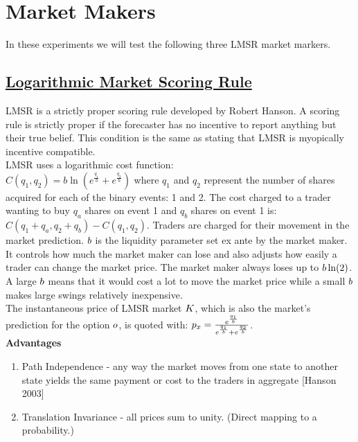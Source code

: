 \section{Market Makers}
In these experiments we will test the following three LMSR market markers.

\subsection{\href{http://mason.gmu.edu/~rhanson/mktscore.pdf}{Logarithmic Market Scoring Rule}}
LMSR is a strictly proper scoring rule developed by Robert Hanson. A scoring rule is strictly proper if the forecaster has no incentive to report anything but their true belief. This condition is the same as stating that LMSR is myopically incentive compatible.\\ 

LMSR uses a logarithmic cost function: \\
$C(q_1,q_2) = b\ln(e^{\frac{q_1}{b}} + e^{\frac{q_2}{b}})$ where $q_1$ and $q_2$ represent the number of shares acquired for each of the binary events: 1 and 2. The cost charged to a trader wanting to buy $q_a$ shares on event 1 and $q_b$ shares on event 1 is: $C(q_1 + q_a, q_2 + q_b) - C(q_1,q_2)$. Traders are charged for their movement in the market prediction. $b$ is the liquidity parameter set ex ante by the market maker. It controls how much the market maker can lose and also adjusts how easily a trader can change the market price. The market maker always loses up to $b\ln(2)$. A large $b$ means that it would cost a lot to move the market price while a small $b$ makes large swings relatively inexpensive.\\

The instantaneous price of LMSR market $K$, which is also the market's prediction for the option $o$, is quoted with: $p_x = \frac{e^{\frac{q_1}{b}}}{e^{\frac{q_1}{b}} + e^{\frac{q_2}{b}}}$. \\

\textbf{Advantages}\\
\begin{enumerate}
\item{Path Independence - any way the market moves from one state to another state yields the same payment or cost to the traders in aggregate [Hanson 2003]}
\item{Translation Invariance - all prices sum to unity. (Direct mapping to a probability.)}
\end{enumerate}


